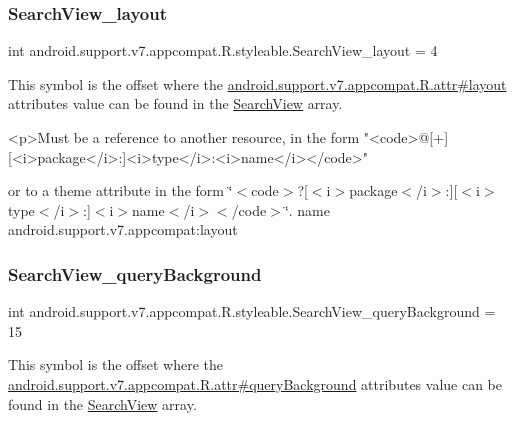 \subsubsection{\texorpdfstring{Search\+View\+\_\+layout}{SearchView\_layout}}
{\footnotesize\ttfamily int android.\+support.\+v7.\+appcompat.\+R.\+styleable.\+Search\+View\+\_\+layout = 4\hspace{0.3cm}{\ttfamily [static]}}

This symbol is the offset where the \hyperlink{classandroid_1_1support_1_1v7_1_1appcompat_1_1R_1_1attr_ab829778c3ab95012bde4b7a24c7a489e}{android.\+support.\+v7.\+appcompat.\+R.\+attr\#layout} attribute\textquotesingle{}s value can be found in the \hyperlink{classandroid_1_1support_1_1v7_1_1appcompat_1_1R_1_1styleable_a01af09df9e38f1e4f57165c3d3cee9fe}{Search\+View} array.

\begin{DoxyVerb}      <p>Must be a reference to another resource, in the form "<code>@[+][<i>package</i>:]<i>type</i>:<i>name</i></code>"
\end{DoxyVerb}
 or to a theme attribute in the form \char`\"{}$<$code$>$?\mbox{[}$<$i$>$package$<$/i$>$\+:\mbox{]}\mbox{[}$<$i$>$type$<$/i$>$\+:\mbox{]}$<$i$>$name$<$/i$>$$<$/code$>$\char`\"{}.  name android.\+support.\+v7.\+appcompat\+:layout \mbox{\label{classandroid_1_1support_1_1v7_1_1appcompat_1_1R_1_1styleable_a4bfbfa40648f5bbab65bd2ad5dc0bd4d}} 
\subsubsection{\texorpdfstring{Search\+View\+\_\+query\+Background}{SearchView\_queryBackground}}
{\footnotesize\ttfamily int android.\+support.\+v7.\+appcompat.\+R.\+styleable.\+Search\+View\+\_\+query\+Background = 15\hspace{0.3cm}{\ttfamily [static]}}

This symbol is the offset where the \hyperlink{classandroid_1_1support_1_1v7_1_1appcompat_1_1R_1_1attr_a99efbff6d3c68cf5516d7ec329aaf55b}{android.\+support.\+v7.\+appcompat.\+R.\+attr\#query\+Background} attribute\textquotesingle{}s value can be found in the \hyperlink{classandroid_1_1support_1_1v7_1_1appcompat_1_1R_1_1styleable_a01af09df9e38f1e4f57165c3d3cee9fe}{Search\+View} array.

